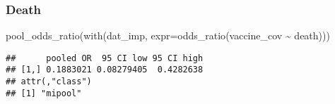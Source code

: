 \documentclass[
]{article}
\newenvironment{Shaded}{\begin{snugshade}}{\end{snugshade}}
\newcommand{\AttributeTok}[1]{\textcolor[rgb]{0.77,0.63,0.00}{#1}}
\newcommand{\FunctionTok}[1]{\textcolor[rgb]{0.00,0.00,0.00}{#1}}
\newcommand{\NormalTok}[1]{#1}
\newcommand{\SpecialCharTok}[1]{\textcolor[rgb]{0.00,0.00,0.00}{#1}}
\begin{document}
\hypertarget{death-2}{%
\subsubsection{Death}\label{death-2}}

\begin{Shaded}
\begin{Highlighting}[]
\FunctionTok{pool\_odds\_ratio}\NormalTok{(}\FunctionTok{with}\NormalTok{(dat\_imp, }\AttributeTok{expr=}\FunctionTok{odds\_ratio}\NormalTok{(vaccine\_cov }\SpecialCharTok{\textasciitilde{}}\NormalTok{ death))) }
\end{Highlighting}
\end{Shaded}

\begin{verbatim}
##      pooled OR  95 CI low 95 CI high
## [1,] 0.1883021 0.08279405  0.4282638
## attr(,"class")
## [1] "mipool"
\end{verbatim}
\end{document}
